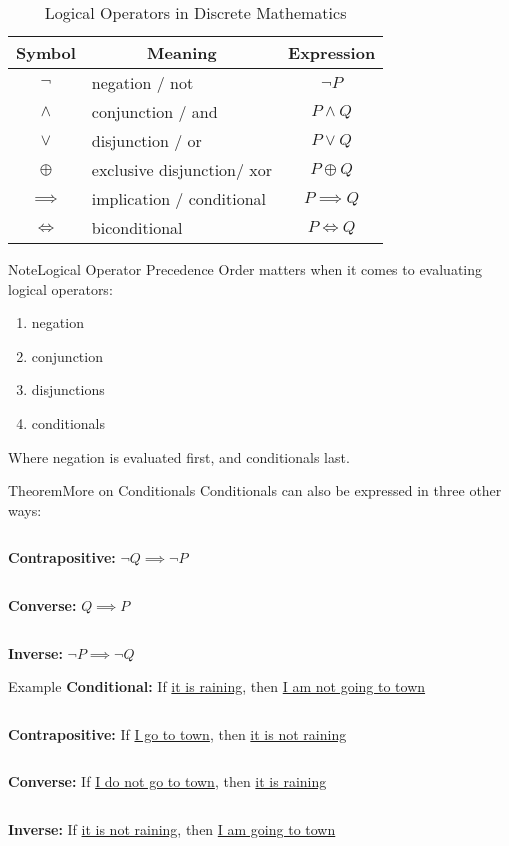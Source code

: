\documentclass{MathNotes}
\newenvironment{example}[1]{\begin{BlueBox}{Example}{#1}}{\end{BlueBox}}
\newenvironment{note}[1]{\begin{YellowBox}{Note}{#1}}{\end{YellowBox}}
\newenvironment{theorem}[1]{\begin{GrayBox}{Theorem}{#1}}{\end{GrayBox}}
\newcommand{\bl}{
	\newline$ $\newline
}
\begin{document}
\begin{table}[h!]\label{tab:logical-operators}
	\centering
	\caption{Logical Operators in Discrete Mathematics}
	\begin{tabular}{clc}
		\multicolumn{1}{c}{\textbf{Symbol}}   &
		\multicolumn{1}{c}{\textbf{Meaning} } &
		\multicolumn{1}{c}{\textbf{Expression}}                                            \\
		\midrule
		$\lnot$                               & negation / not             & $\lnot P$     \\
		$\land$                               & conjunction / and          & $P\land Q$    \\
		$\lor$                                & disjunction / or           & $P\lor Q$     \\
		$\oplus$                              & exclusive disjunction/ xor & $P\oplus Q$   \\
		$\implies$                            & implication / conditional  & $P\implies Q$ \\
		$\iff$                                & biconditional              & $P\iff Q$     \\
	\end{tabular}
\end{table}

\begin{note}{Logical Operator Precedence}\label{order-of-operations}
	Order matters when it comes to evaluating logical operators:
	\begin{enumerate}
		\item negation
		\item conjunction
		\item disjunctions
		\item conditionals
	\end{enumerate}
	Where negation is evaluated first, and conditionals last.
\end{note}

\newpage
\begin{multicols}{2}
	\begin{theorem}{More on Conditionals}\label{th:conditionals-extra}
		Conditionals can also be expressed in three other ways:
		\bl
		\textbf{Contrapositive:} $\lnot Q\implies\lnot P$
		\bl
		\textbf{Converse:} $Q\implies P$
		\bl
		\textbf{Inverse:} $\lnot P\implies\lnot Q$
	\end{theorem}
	\begin{example}{}
		\textbf{Conditional:} If \underline{it is raining}, then \underline{I am not going to town}
		\bl
		\textbf{Contrapositive:} If \underline{I go to town}, then \underline{it is not raining}
		\bl
		\textbf{Converse:} If \underline{I do not go to town}, then \underline{it is raining}
		\bl
		\textbf{Inverse:} If \underline{it is not raining}, then \underline{I am going to town}
	\end{example}
\end{multicols}
\end{document}
